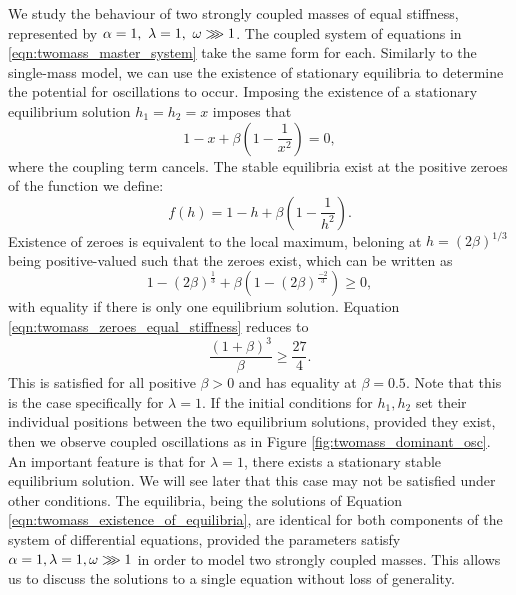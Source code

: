 \documentclass{report}
\begin{document}
We study the behaviour of two strongly coupled masses of equal stiffness, represented by \( \alpha = 1,~\lambda = 1,~\omega \gggtr 1\).
The coupled system of equations in \ref{eqn:twomass_master_system} take the same form for each.
Similarly to the single-mass model, we can use the existence of stationary equilibria to determine the potential for oscillations to occur.
Imposing the existence of a stationary equilibrium solution \(h_1 = h_2 = x\) imposes that
\begin{equation}
    1 - x + \beta\left(
        1 - \frac{1}{x^2}
    \right) = 0,
\end{equation}
where the coupling term cancels.
The stable equilibria exist at the positive zeroes of the function we define:
\begin{equation}
    f(h) = 1 - h + \beta \left( 1 - \frac{1}{h^2} \right).
    \label{eqn:twomass_existence_of_equilibria}
\end{equation}
Existence of zeroes is equivalent to the local maximum, beloning at \(h = \left( 2\beta \right)^{1/3}\) being positive-valued such that the zeroes exist,
which can be written as
\begin{equation}
    1 - \left(2\beta\right)^\frac{1}{3} + \beta\left( 1 - (2\beta)^\frac{-2}{3} \right) \ge 0,
    \label{eqn:twomass_zeroes_equal_stiffness}
\end{equation}
with equality if there is only one equilibrium solution.
Equation \ref{eqn:twomass_zeroes_equal_stiffness} reduces to
\begin{equation}
    \frac{(1+\beta)^3}{\beta} \ge \frac{27}{4}.
\end{equation}
This is satisfied for all positive $\beta>0$ and has equality at $\beta = 0.5$.
Note that this is the case specifically for $\lambda = 1$.
If the initial conditions for \(h_1, h_2\) set their individual positions between the two equilibrium solutions,
provided they exist,
then we observe coupled oscillations as in Figure \ref{fig:twomass_dominant_osc}.
An important feature is that for \(\lambda = 1\), there exists a stationary stable equilibrium solution.
We will see later that this case may not be satisfied under other conditions. %
The equilibria, being the solutions of Equation \ref{eqn:twomass_existence_of_equilibria}, are identical for both components of the system of differential equations,
provided the parameters satisfy \(\alpha = 1, \lambda = 1, \omega \gggtr 1\) in order to model two strongly coupled masses.
This allows us to discuss the solutions to a single equation without loss of generality.
\end{document}
